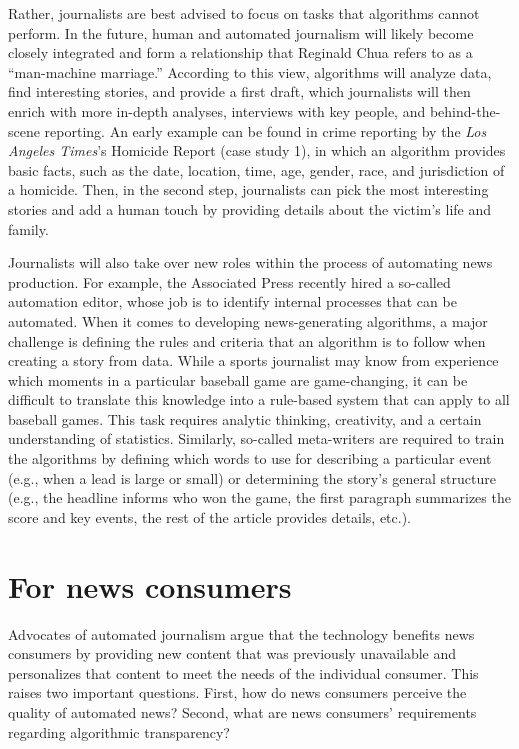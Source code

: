 \documentclass[notoc, symmetric, nobib, nols]{towcenter-book}
\begin{document}
Rather, journalists are best advised to focus on tasks that algorithms cannot perform. In the future, human and automated journalism will likely become closely integrated and form a relationship that Reginald Chua refers to as a ``man-machine marriage.'' According to this view, algorithms will analyze data, find interesting stories, and provide a first draft, which journalists will then enrich with more in-depth analyses, interviews with key people, and behind-the-scene reporting. An early example can be found in crime reporting by the \textit{Los Angeles Times}’s Homicide Report (case study 1), in which an algorithm provides basic facts, such as the date, location, time, age, gender, race, and jurisdiction of a homicide. Then, in the second step, journalists can pick the most interesting stories and add a human touch by providing details about the victim’s life and family.\cite{young15} 

Journalists will also take over new roles within the process of automating news production. For example, the Associated Press recently hired a so-called automation editor, whose job is to identify internal processes that can be automated. When it comes to developing news-generating algorithms, a major challenge is defining the rules and criteria that an algorithm is to follow when creating a story from data. While a sports journalist may know from experience which moments in a particular baseball game are game-changing, it can be difficult to translate this knowledge into a rule-based system that can apply to all baseball games. This task requires analytic thinking, creativity, and a certain understanding of statistics. Similarly, so-called meta-writers are required to train the algorithms by defining which words to use for describing a particular event (e.g., when a lead is large or small) or determining the story’s general structure (e.g., the headline informs who won the game, the first paragraph summarizes the score and key events, the rest of the article provides details, etc.).

\section{For news consumers}

Advocates of automated journalism argue that the technology benefits news consumers by providing new content that was previously unavailable and personalizes that content to meet the needs of the individual consumer. This raises two important questions. First, how do news consumers perceive the quality of automated news? Second, what are news consumers’ requirements regarding algorithmic transparency?
 
\end{document}
